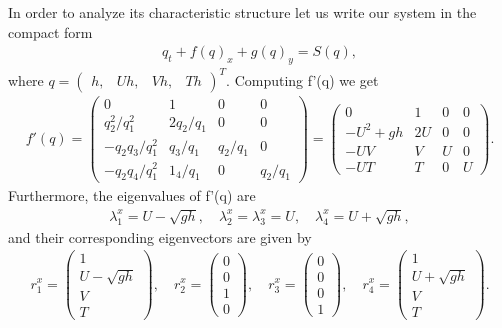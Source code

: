 \documentclass[12pt]{article}
\begin{document}
In order to analyze its characteristic structure let us write our system in the compact form 
\begin{align}
    q_t+f(q)_x+g(q)_y=S(q),
\end{align}
where 
$
q=\begin{pmatrix} h,& Uh, & Vh,& Th\end{pmatrix}^T.
$
Computing f'(q) we get
\begin{align}
    f'(q)=
    \begin{pmatrix}
        0 & 1 & 0 & 0\\
        q_2^2/q_1^2 & 2q_2/q_1 & 0 & 0\\
        -q_2q_3/q_1^2 & q_3/q_1 & q_2/q_1 & 0\\
        -q_2q_4/q_1^2 & 1_4/q_1 & 0 & q_2/q_1
    \end{pmatrix}
    =\begin{pmatrix}
        0 & 1 & 0 & 0\\
        -U^2+gh & 2U & 0 & 0\\
        -UV & V & U & 0\\
        -UT & T & 0 & U
    \end{pmatrix}.
\end{align}
Furthermore, the eigenvalues of f'(q) are 
\begin{align}
    \label{eq: eigenvalues f'(q)}
    \lambda^x_1=U-\sqrt{gh}, \quad \lambda^x_2=\lambda^x_3=U,\quad \lambda^x_4=U+\sqrt{gh},
\end{align}
and their corresponding eigenvectors are given by
\begin{align}
    r^x_1=
    \begin{pmatrix} 
        1\\
        U-\sqrt{gh}\\
        V\\
        T
    \end{pmatrix},
    \quad
    r^x_2=
    \begin{pmatrix} 
        0\\
        0\\
        1\\
        0
    \end{pmatrix},
    \quad
    r^x_3=
    \begin{pmatrix} 
        0\\
        0\\
        0\\
        1
    \end{pmatrix},
    \quad
    r^x_4=
    \begin{pmatrix} 
        1\\
        U+\sqrt{gh}\\
        V\\
        T
    \end{pmatrix}.
\end{align}
\end{document}
